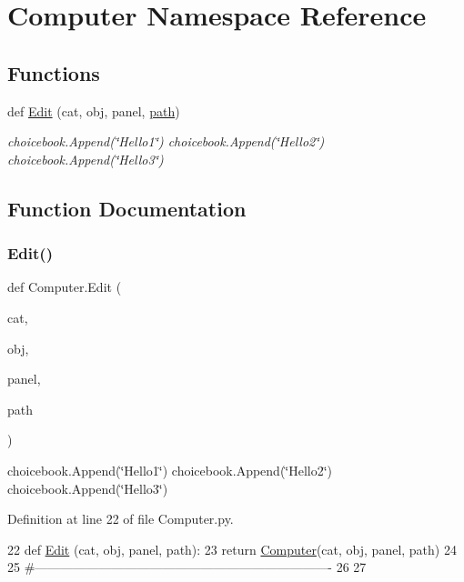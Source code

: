 \hypertarget{namespaceComputer}{}\section{Computer Namespace Reference}
\label{namespaceComputer}
\subsection*{Functions}
\begin{DoxyCompactItemize}
\item 
def \hyperlink{namespaceComputer_a910967bcdac232df0acc922c1fe63270}{Edit} (cat, obj, panel, \hyperlink{classHierarchy_aa7990fa7caf132d83e361ce033c6c65a}{path})
\begin{DoxyCompactList}\small\item\em choicebook.\+Append(\char`\"{}\+Hello1\char`\"{}) choicebook.\+Append(\char`\"{}\+Hello2\char`\"{}) choicebook.\+Append(\char`\"{}\+Hello3\char`\"{}) \end{DoxyCompactList}\end{DoxyCompactItemize}


\subsection{Function Documentation}
\mbox{\label{namespaceComputer_a910967bcdac232df0acc922c1fe63270}} 
\subsubsection{\texorpdfstring{Edit()}{Edit()}}
{\footnotesize\ttfamily def Computer.\+Edit (\begin{DoxyParamCaption}\item[{}]{cat,  }\item[{}]{obj,  }\item[{}]{panel,  }\item[{}]{path }\end{DoxyParamCaption})}



choicebook.\+Append(\char`\"{}\+Hello1\char`\"{}) choicebook.\+Append(\char`\"{}\+Hello2\char`\"{}) choicebook.\+Append(\char`\"{}\+Hello3\char`\"{}) 



Definition at line 22 of file Computer.\+py.


\begin{DoxyCode}
22 \textcolor{keyword}{def }\hyperlink{namespaceComputer_a910967bcdac232df0acc922c1fe63270}{Edit} (cat, obj, panel, path):
23     \textcolor{keywordflow}{return} \hyperlink{classComputer}{Computer}(cat, obj, panel, path)
24 
25 \textcolor{comment}{#----------------------------------------------------------------------}
26 
27 \end{DoxyCode}
